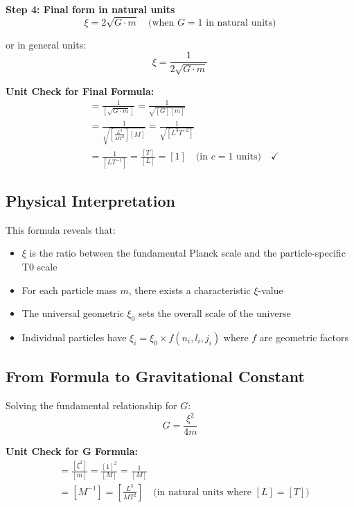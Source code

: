 \documentclass[12pt,a4paper]{article}
\theoremstyle{definition}
\begin{document}
	\textbf{Step 4: Final form in natural units}
	\begin{equation}
		\boxed{\xi = 2\sqrt{G \cdot m}} \quad \text{(when } G = 1 \text{ in natural units)}
	\end{equation}
	
	or in general units:
	\begin{equation}
		\boxed{\xi = \frac{1}{2\sqrt{G \cdot m}}}
	\end{equation}
	
	 
		\textbf{Unit Check for Final Formula:}
		\begin{align}
			[\xi] &= \frac{1}{[\sqrt{G \cdot m}]} = \frac{1}{\sqrt{[G][m]}} \\
			&= \frac{1}{\sqrt{\left[\frac{L^3}{MT^2}\right][M]}} = \frac{1}{\sqrt{[L^3T^{-2}]}} \\
			&= \frac{1}{[LT^{-1}]} = \frac{[T]}{[L]} = [1] \quad \text{(in } c=1 \text{ units)} \quad \checkmark
		\end{align}
	 
	
	\subsection{Physical Interpretation}
	
	This formula reveals that:
	\begin{itemize}
		\item $\xi$ is the ratio between the fundamental Planck scale and the particle-specific T0 scale
		\item For each particle mass $m$, there exists a characteristic $\xi$-value
		\item The universal geometric $\xi_0$ sets the overall scale of the universe
		\item Individual particles have $\xi_i = \xi_0 \times f(n_i, l_i, j_i)$ where $f$ are geometric factors
	\end{itemize}
	
	\subsection{From Formula to Gravitational Constant}
	
	Solving the fundamental relationship for $G$:
	\begin{equation}
		\boxed{G = \frac{\xi^2}{4m}}
	\end{equation}
	
	 
		\textbf{Unit Check for G Formula:}
		\begin{align}
			[G] &= \frac{[\xi^2]}{[m]} = \frac{[1]^2}{[M]} = \frac{1}{[M]} \\
			&= [M^{-1}] = \left[\frac{L^3}{MT^2}\right] \quad \text{(in natural units where } [L]=[T] \text{)}
		\end{align}
		
\end{document}
